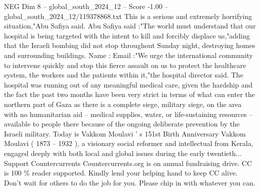 \begin{textsample}{NEG Dim 8 – global\_south\_2024\_12 – Score -1.00 – global\_south\_2024\_12/119378868.txt}
This is a serious and extremely horrifying situation,"Abu Safiya said.
Abu Safiya said :"The world must understand that our hospital is being targeted with the intent to kill and forcibly displace us,"adding that the Israeli bombing did not stop throughout Sunday night, destroying homes and surrounding buildings.
Name : Email :"We urge the international community to intervene quickly and stop this fierce assault on us to protect the healthcare system, the workers and the patients within it,"the hospital director said.
The hospital was running out of any meaningful medical care, given the hardship and the fact the past two months have been very strict in terms of what can enter the northern part of Gaza as there is a complete siege, military siege, on the area with no humanitarian aid -- medical supplies, water, or life-sustaining resources -- available to people there because of the ongoing deliberate prevention by the Israeli military.
Today is Vakkom Moulavi ' s 151st Birth Anniversary Vakkom Moulavi ( 1873 -- 1932 ), a visionary social reformer and intellectual from Kerala, engaged deeply with both local and global issues during the early twentieth...
Support Countercurrents Countercurrents.org is on annual fundraising drive.
CC is 100 \% reader supported.
Kindly lend your helping hand to keep CC alive.
Don't wait for others to do the job for you.
Please chip in with whatever you can.

\end{textsample}
